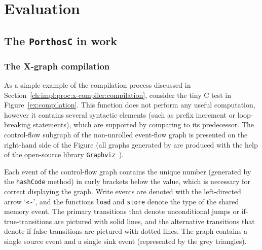 \chapter{Evaluation}
\label{ch:eval}


\section{The \texttt{PorthosC} in work}

\subsection{The X-graph compilation}

As a simple example of the compilation process discussed in Section~\ref{ch:impl:proc:x-compiler:compilation}, consider the tiny C test in Figure~\ref{ex:compilation}.
This function does not perform any useful computation, however it contains several syntactic elements (such as prefix increment or loop-breaking statements), which are supported by \porthos[2] comparing to its predecessor.
The control-flow subgraph \xgraph[CF] of the non-unrolled event-flow graph is presented on the right-hand side of the Figure (all graphs generated by \porthos[2] are produced with the help of the open-source library \texttt{Graphviz}~\cite{ellson2001graphviz}).

Each event of the control-flow graph contains the unique number (generated by the \texttt{hashCode} method) in curly brackets below the value, which is necessary for correct displaying the graph.
Write events are denoted with the left-directed arrow `\lstinline{<-}', and the functions \lstinline{load} and \lstinline{store} denote the type of the shared memory event.
The primary transitions that denote unconditional jumps or if-true-transitions are pictured with solid lines, and the alternative transitions that denote if-false-transitions are pictured with dotted lines.
The graph contains a single source event and a single sink event (represented by the grey triangles).

